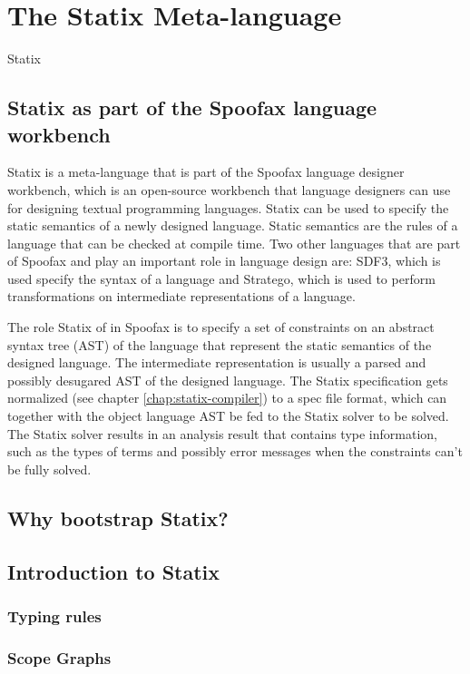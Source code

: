 
\chapter{\label{chap:statix-meta-language}The Statix Meta-language}

Statix \autocite{AntwerpenPRV18}

\section{Statix as part of the Spoofax language workbench}

Statix is a meta-language that is part of the Spoofax language designer workbench, which is an open-source workbench that language designers can use for designing textual programming languages. Statix can be used to specify the static semantics of a newly designed language. Static semantics are the rules of a language that can be checked at compile time. Two other languages that are part of Spoofax and play an important role in language design are: SDF3, which is used specify the syntax of a language and Stratego, which is used to perform transformations on intermediate representations of a language.

The role Statix of in Spoofax is to specify a set of constraints on an abstract syntax tree (AST) of the language that represent the static semantics of the designed language. The intermediate representation is usually a parsed and possibly desugared AST of the designed language.
The Statix specification gets normalized (see chapter \ref{chap:statix-compiler}) to a spec file format, which can together with the object language AST be fed to the Statix solver to be solved. The Statix solver results in an analysis result that contains type information, such as the types of terms and possibly error messages when the constraints can't be fully solved.

\section{Why bootstrap Statix?}

\section{Introduction to Statix}

\subsection{Typing rules}

\subsection{Scope Graphs}
